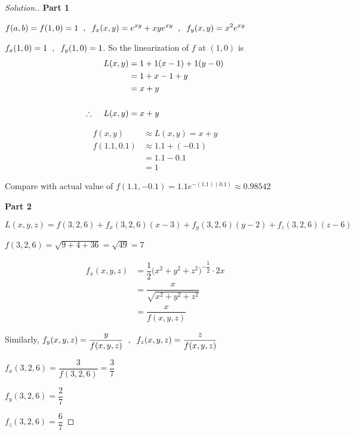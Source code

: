 \documentclass[11pt,a4paper]{article}
\theoremstyle{definition}
\newenvironment{solution}
  {\renewcommand{\qedsymbol}{}\begin{proof}[\textit{Solution}.]}
  {\end{proof}}
\newcommand{\subhead}[1]{%
  \par\medskip\noindent\textbf{#1}\par\nobreak\smallskip}
\begin{document}
\begin{solution}
\subhead{Part 1}
$f(a,b) = f(1,0) = 1 \hspace{0.2cm} , \hspace{0.2cm} f_x(x,y) = \displaystyle{e^{xy} + xye^{xy}}\hspace{0.2cm} , \hspace{0.2cm} f_y(x,y) = \displaystyle{x^2 e^{xy}}$

$f_x(1,0) = 1\hspace{0.2cm} , \hspace{0.2cm} f_y (1,0) = 1$. So the linearization of $f$ at $(1,0)$ is 
\begin{align*}
L(x,y) & = 1 + 1(x-1) + 1(y-0)\\
& = 1 + x - 1 + y\\
& = x+y\\\\
\therefore\hspace{0.4cm} L(x,y) &  = x + y
\end{align*}

\begin{align*}
f(x,y) & \approx L(x,y) = x + y\\
f(1.1,0.1) & \approx 1.1 + (-0.1)\\
& = 1.1 - 0.1\\
& = 1
\end{align*}

Compare with actual value of $f(1.1,-0.1) = \displaystyle{1.1e^{-(1.1)(0.1)}}\approx 0.98542$

\subhead{Part 2}
$$L(x,y,z) = f(3,2,6) + f_x(3,2,6)(x-3) + f_y(3,2,6)(y-2) + f_z(3,2,6)(z - 6)$$

$f(3,2,6) = \sqrt{9 + 4 + 36} = \sqrt{49}= 7$

\begin{align*}
f_x(x,y,z) & = \dfrac{1}{2}\Big( x^2 + y^2 + z^2\Big)^{-\dfrac{1}{2}}\cdot 2x\\
& = \dfrac{x}{\sqrt{x^2 + y^2 + z^2}}\\
& = \dfrac{x}{f(x,y,z)}
\end{align*}

Similarly, $\displaystyle{f_y(x,y,z) =  \dfrac{y}{f(x,y,z)}}\hspace{0.2cm} ,\hspace{0.2cm} \displaystyle{f_z(x,y,z) =  \dfrac{z}{f(x,y,z)}}$

$f_x(3,2,6) = \dfrac{3}{f(3,2,6)} = \dfrac{3}{7}$

$f_y(3,2,6) = \dfrac{2}{7}$

$f_z(3,2,6) = \dfrac{6}{7}$


\end{solution}
\end{document}
